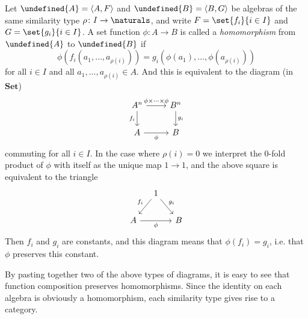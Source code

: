 \documentclass[article, a4paper, 11pt, oneside]{memoir}
\let\mathfrak\undefined
\numberwithin{equation}{chapter}
\newcommand{\frakA}{\mathfrak{A}}
\newcommand{\frakB}{\mathfrak{B}}
\newcommand{\ncat}[1]{\mathbf{#1}} %
\newcommand{\catSet}{\ncat{Set}} %
\theoremstyle{nonumberplain}
\begin{document}
\begin{remarkbreak}
    Let $\frakA = \langle A, F \rangle$ and $\frakB = \langle B, G \rangle$ be algebras of the same similarity type $\rho \colon I \to \naturals$, and write $F = \set{f_i}{i \in I}$ and $G = \set{g_i}{i \in I}$. A set function $\phi \colon A \to B$ is called a \emph{homomorphism} from $\frakA$ to $\frakB$ if
    \begin{equation*}
        \phi \left( f_i(a_1, \ldots, a_{\rho(i)}) \right)
            = g_i \left( \phi(a_1), \ldots, \phi(a_{\rho(i)}) \right)
    \end{equation*}
    for all $i \in I$ and all $a_1, \ldots, a_{\rho(i)} \in A$. And this is equivalent to the diagram (in $\catSet$)
    \begin{equation*}
        \begin{tikzcd}
            A^n
                \ar[r, "\phi \times \cdots \times \phi"]
                \ar[d, "f_i", swap]
            & B^n
                \ar[d, "g_i"] \\
            A
                \ar[r, "\phi", swap]
            & B
        \end{tikzcd}
    \end{equation*}
    commuting for all $i \in I$. In the case where $\rho(i) = 0$ we interpret the $0$-fold product of $\phi$ with itself as the unique map $1 \to 1$, and the above square is equivalent to the triangle
    \begin{equation*}
        \begin{tikzcd}[column sep=small]
            & 1
                \ar[dl, "f_i", swap]
                \ar[dr, "g_i"] \\
            A
                \ar[rr, "\phi", swap]
            && B
        \end{tikzcd}
    \end{equation*}
    Then $f_i$ and $g_i$ are constants, and this diagram means that $\phi(f_i) = g_i$, i.e. that $\phi$ preserves this constant.

    By pasting together two of the above types of diagrams, it is easy to see that function composition preserves homomorphisms. Since the identity on each algebra is obviously a homomorphism, each similarity type gives rise to a category.
\end{remarkbreak}
\end{document}
